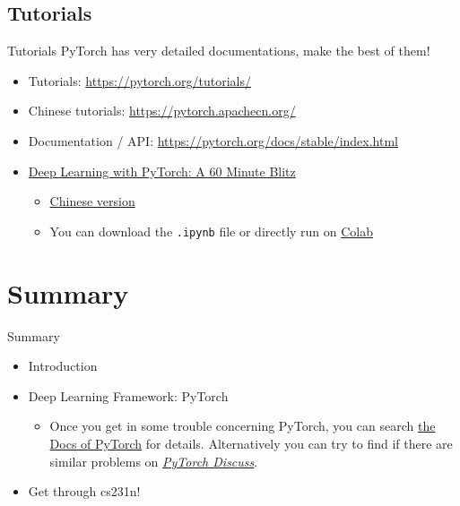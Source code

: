 \documentclass{../TexTemplate/myslide}
\begin{document}
\subsection{Tutorials}
\begin{frame}[fragile]{Tutorials}
PyTorch has very detailed documentations, make the best of them!
\begin{itemize}
	\item Tutorials: \url{https://pytorch.org/tutorials/}
	\item Chinese tutorials: \url{https://pytorch.apachecn.org/}
	\item Documentation / API: \url{https://pytorch.org/docs/stable/index.html}
	\item \href{https://pytorch.org/tutorials/beginner/deep_learning_60min_blitz.html}{Deep Learning with PyTorch: A 60 Minute Blitz}
	\begin{itemize}
		\item \href{https://pytorch.apachecn.org/docs/1.0/deep_learning_60min_blitz.html}{Chinese version}
		\item You can download the \verb'.ipynb' file or directly run on \href{https://colab.research.google.com/}{Colab}
	\end{itemize}
\end{itemize}
\end{frame}

\section{Summary}
\begin{frame}
\sectionpage
\end{frame}

\begin{frame}{Summary}
\begin{itemize}
	\item Introduction
	\item Deep Learning Framework: PyTorch
	\begin{itemize}
		\item Once you get in some trouble concerning PyTorch, you can search \href{http://pytorch.org/docs/master/index.html}{the Docs of PyTorch} for details. Alternatively you can try to find if there are similar problems on \href{https://discuss.pytorch.org/}{\emph{PyTorch Discuss}}.
	\end{itemize}
	\item Get through cs231n!
\end{itemize}
\end{frame}
\end{document}

